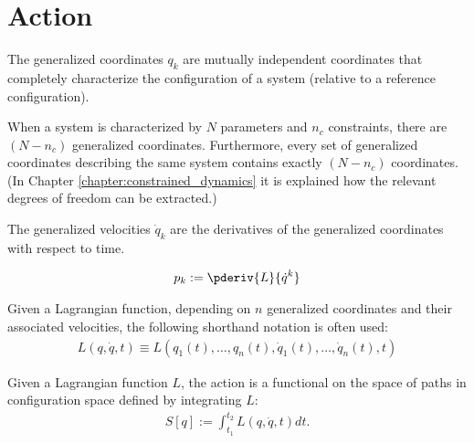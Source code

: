 
\section{Action}

    \begin{definition}
        The generalized coordinates $q_k$ are mutually independent coordinates that completely characterize the configuration of a system (relative to a reference configuration).

        When a system is characterized by $N$ parameters and $n_c$ constraints, there are $(N-n_c)$ generalized coordinates. Furthermore, every set of generalized coordinates describing the same system contains exactly $(N-n_c)$ coordinates. (In Chapter \ref{chapter:constrained_dynamics} it is explained how the relevant degrees of freedom can be extracted.)
    \end{definition}
    \begin{definition}
        The generalized velocities $\dot{q}_k$ are the derivatives of the generalized coordinates with respect to time.
    \end{definition}
    \begin{definition}\label{lagrange:conjugate_momentum}
        \begin{gather}
            p_k := \pderiv{L}{\dot{q}^k}
        \end{gather}
    \end{definition}

    \begin{notation}\label{lagrange:notational_convention_1}
        Given a Lagrangian function, depending on $n$ generalized coordinates and their associated velocities, the following shorthand notation is often used:
        \begin{gather}
            L\left(q,\dot{q},t\right)\equiv L\left(q_1(t),\ldots,q_n(t),\dot{q}_1(t),\ldots,\dot{q}_n(t),t\right)
        \end{gather}
    \end{notation}
    \begin{definition}[Action]\label{lagrange:action}
        Given a Lagrangian function $L$, the action is a functional on the space of paths in configuration space defined by integrating $L$:
        \begin{gather}
            S[q] := \int_{t_1}^{t_2}L\left(q,\dot{q},t\right)dt.
        \end{gather}
    \end{definition}

